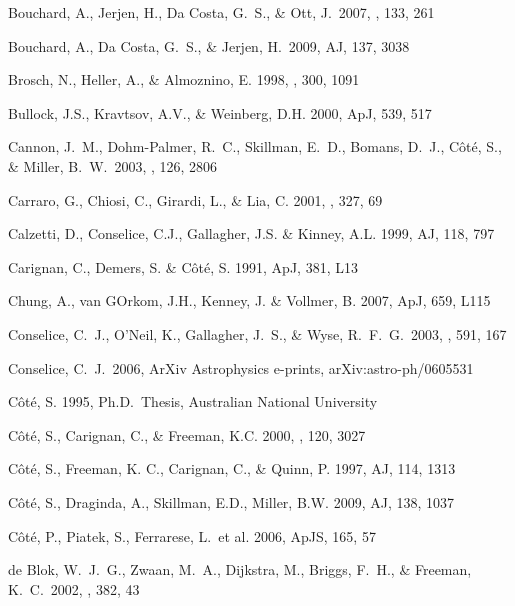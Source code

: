 \documentclass[12pt,preprint]{aastex}
\begin{document}
\begin{thebibliography}{}
Bouchard, A., Jerjen, H., Da Costa, G.~S., \& Ott, J.\ 2007, \aj, 133, 261 

Bouchard, A., Da Costa, G.~S., \& Jerjen, H.\ 2009, AJ, 137, 3038

Brosch, N., Heller, A., \& Almoznino, E. 1998, \mnras , 300, 1091

Bullock, J.S., Kravtsov, A.V., \& Weinberg, D.H. 2000, ApJ, 539, 517

Cannon, J.~M., Dohm-Palmer, R.~C., Skillman, E.~D., Bomans, D.~J., 
C{\^o}t{\'e}, S., \& Miller, B.~W.\ 2003, \aj, 126, 2806 

Carraro, G., Chiosi, C., Girardi, L., \& Lia, C. 2001, \mnras, 327, 69 

Calzetti, D., Conselice, C.J., Gallagher, J.S. \& Kinney, A.L. 1999, AJ, 118, 797

Carignan, C., Demers, S. \& C\^ot\'e, S. 1991, ApJ, 381, L13

Chung, A., van GOrkom, J.H., Kenney, J. \& Vollmer, B. 2007, ApJ, 659, L115 

Conselice, C.~J., O'Neil, K., Gallagher, J.~S., \& Wyse, R.~F.~G.\ 2003, \apj, 591, 167 

Conselice, C.~J.\ 2006, ArXiv Astrophysics e-prints, arXiv:astro-ph/0605531 

C\^ot\'e, S. 1995, Ph.D.\ Thesis, Australian National University

C\^ot\'e, S., Carignan, C., \& Freeman, K.C. 2000, \aj , 120, 3027

C\^ot\'e, S., Freeman, K. C., Carignan, C., \& Quinn, P. 1997, AJ, 114, 1313

C\^ot\'e, S., Draginda, A., Skillman, E.D., Miller, B.W. 2009, AJ, 138, 1037

C\^ot\'e, P., Piatek, S., Ferrarese, L.~et al. 2006, ApJS, 165, 57

 de Blok, W.~J.~G., 
Zwaan, M.~A., Dijkstra, M., Briggs, F.~H., \& Freeman, K.~C.\ 2002, \aap, 
382, 43 


\end{thebibliography}
\end{document}
